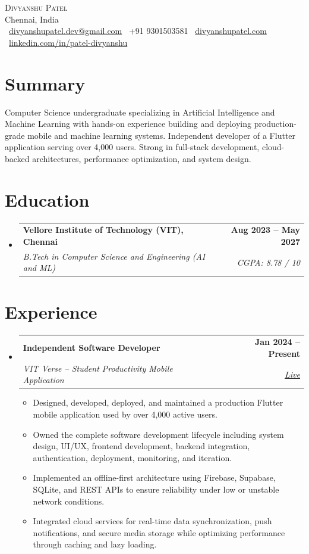 \documentclass[letterpaper,11pt]{article}
\makeatletter
\newcommand{\resumeItem}[1]{\item \small{#1}}
\newcommand{\resumeItemListStart}{\begin{itemize}[leftmargin=0.15in]}
\newcommand{\resumeItemListEnd}{\end{itemize}\vspace{-6pt}}
\newcommand{\resumeSectionStart}{\begin{itemize}[leftmargin=0in, label={}]}
\newcommand{\resumeSectionEnd}{\end{itemize}}
\newcommand{\resumeSubheading}[4]{
  \item
  \begin{tabular*}{\textwidth}{l@{\extracolsep{\fill}}r}
    \textbf{#1} & \textbf{\small #2} \\
    \textit{\small #3} & \textit{\small #4} \\
  \end{tabular*}\vspace{-6pt}
}
\makeatother
\begin{document}
\begin{center}
    {\Huge \scshape Divyanshu Patel} \\[2pt]
    \small Chennai, India \\[4pt]
    \small
    \raisebox{-0.15\height}{\faEnvelope}\ 
    \href{mailto:divyanshupatel.dev@gmail.com}{divyanshupatel.dev@gmail.com}
    \hspace{12pt}
    \raisebox{-0.15\height}{\faPhone}\ 
    +91 9301503581
    \hspace{12pt}
    \raisebox{-0.15\height}{\faGlobe}\ 
    \href{https://divyanshupatel.com}{divyanshupatel.com}
    \hspace{12pt}
    \raisebox{-0.15\height}{\faLinkedin}\ 
    \href{https://www.linkedin.com/in/patel-divyanshu/}{linkedin.com/in/patel-divyanshu}
\end{center}


\section{Summary}
Computer Science undergraduate specializing in Artificial Intelligence and Machine Learning with hands-on experience building and deploying production-grade mobile and machine learning systems. Independent developer of a Flutter application serving over 4,000 users. Strong in full-stack development, cloud-backed architectures, performance optimization, and system design.

\section{Education}
\resumeSectionStart
\resumeSubheading
{Vellore Institute of Technology (VIT), Chennai}{Aug 2023 -- May 2027}
{B.Tech in Computer Science and Engineering (AI and ML)}{CGPA: 8.78 / 10}
\resumeSectionEnd

\section{Experience}
\resumeSectionStart
\resumeSubheading
{Independent Software Developer}{Jan 2024 -- Present}
{VIT Verse – Student Productivity Mobile Application}{\href{https://vitverse.divyanshupatel.com}{Live}}
\resumeItemListStart
\resumeItem{Designed, developed, deployed, and maintained a production Flutter mobile application used by over 4,000 active users.}
\resumeItem{Owned the complete software development lifecycle including system design, UI/UX, frontend development, backend integration, authentication, deployment, monitoring, and iteration.}
\resumeItem{Implemented an offline-first architecture using Firebase, Supabase, SQLite, and REST APIs to ensure reliability under low or unstable network conditions.}
\resumeItem{Integrated cloud services for real-time data synchronization, push notifications, and secure media storage while optimizing performance through caching and lazy loading.}
\resumeItemListEnd
\resumeSectionEnd
\end{document}
